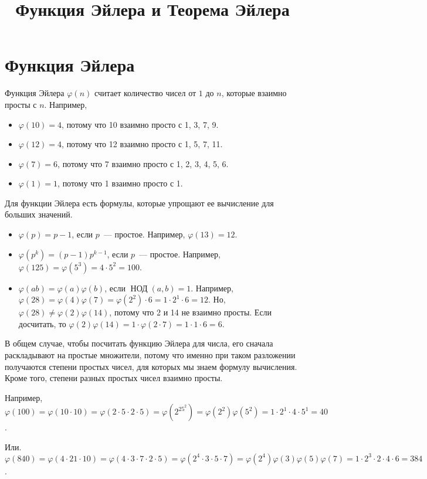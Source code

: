 \documentclass{article}
\title{Функция Эйлера и Теорема Эйлера}
\author{}
\date{}
\newcommand{\ephi}[1]{\varphi(#1)}
\begin{document}
    \maketitle

    \section{Функция Эйлера}
    Функция Эйлера $\ephi{n}$ считает количество чисел от $1$ до $n$, которые взаимно просты с $n$.
    Например,
    \begin{itemize}
        \item $\ephi{10}=4$, потому что 10 взаимно просто с 1, 3, 7, 9.
        \item $\ephi{12}=4$, потому что 12 взаимно просто с 1, 5, 7, 11.
        \item $\ephi7=6$, потому что 7 взаимно просто с 1, 2, 3, 4, 5, 6.
        \item $\ephi1=1$, потому что 1 взаимно просто с 1.
    \end{itemize}

    Для функции Эйлера есть формулы, которые упрощают ее вычисление для больших значений.

    \begin{itemize}
        \item $\ephi{p}=p-1$, если $p$~--- простое.
              Например, $\ephi{13}=12$.
        \item $\ephi{p^k}=(p-1)p^{k-1}$, если $p$~--- простое.
              Например, $\ephi{125}=\ephi{5^3}=4\cdot 5^2=100$.
        \item $\ephi{ab}=\ephi{a}\ephi{b}$, если $\mathop{\text{НОД}}(a, b)=1$.
              Например, $\ephi{28}=\ephi4\ephi7=\ephi{2^2}\cdot6=1\cdot2^1\cdot6=12$.
              Но, $\ephi{28}\ne\ephi{2}\ephi{14}$, потому что 2 и 14 не взаимно просты.
              Если досчитать, то $\ephi{2}\ephi{14}=1\cdot\ephi{2\cdot7}=1\cdot1\cdot6=6$.
    \end{itemize}

    В общем случае, чтобы посчитать функцию Эйлера для числа, его сначала раскладывают на простые множители, потому что именно при таком разложении получаются степени простых чисел, для которых мы знаем формулу вычисления. Кроме того, степени разных простых чисел взаимно просты.

    Например, $\ephi{100}=\ephi{10\cdot10}=\ephi{2\cdot5\cdot2\cdot5}=\ephi{2^25^2}=\ephi{2^2}\ephi{5^2}=
    1\cdot2^1\cdot4\cdot5^1=40$.

    Или. $\ephi{840}=\ephi{4\cdot21\cdot10}=\ephi{4\cdot3\cdot7\cdot2\cdot5}=\ephi{2^4\cdot3\cdot5\cdot7}=
    \ephi{2^4}\ephi3\ephi5\ephi7=1\cdot2^3\cdot2\cdot4\cdot6=384$.
\end{document}
